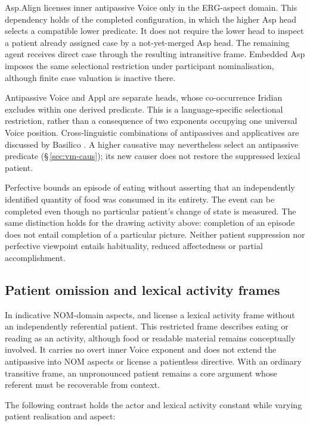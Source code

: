 Asp.Align licenses inner antipassive Voice only in the ERG-aspect domain.
This dependency holds of the completed configuration, in which the higher Asp
head selects a compatible lower predicate. It does not require the lower head
to inspect a patient already assigned case by a not-yet-merged Asp head. The
remaining agent receives direct case through the resulting intransitive frame.
Embedded Asp imposes the same selectional restriction under participant
nominalisation, although finite case valuation is inactive there.

Antipassive Voice and Appl are separate heads, whose co-occurrence Iridian
excludes within one derived predicate. This is a language-specific selectional
restriction, rather than a consequence of two exponents occupying one universal
Voice position. Cross-linguistic combinations of antipassives and applicatives
are discussed by Basilico \cite[ch.~5]{basilico2026}. A higher causative may nevertheless select an antipassive
predicate (§\,\ref{sec:vm-caus}); its new causer does not restore the
suppressed lexical patient.

Perfective  bounds an episode of eating without asserting that
an independently identified quantity of food was consumed in its entirety.
The event can be completed even though no particular patient's change of state
is measured. The same distinction holds for the drawing activity above:
completion of an episode does not entail completion of a particular picture.
Neither patient suppression nor perfective viewpoint entails habituality,
reduced affectedness or partial accomplishment.

\subsection{Patient omission and lexical activity frames}
\label{sec:nom-activity}

In indicative NOM-domain aspects,   and 
 license a lexical activity frame without an independently
referential patient.
This restricted frame describes eating or reading as an activity, although food
or readable material remains conceptually involved. It carries no overt inner
Voice exponent and does not extend the antipassive into NOM aspects or
license a patientless directive. With an ordinary transitive frame, an
unpronounced patient remains a core
argument whose referent must be recoverable from context.

The following contrast holds the actor and lexical activity constant while
varying patient realisation and aspect:

